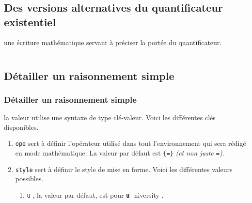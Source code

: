\documentclass[12pt,a4paper]{book}
\theoremstyle{definition}
\newcommand\separation{
	\medskip
	\hfill\rule{0.5\textwidth}{0.75pt}\hfill
	\medskip
}
\newcommand\whyprefix[2]{%
	\textbf{\prefix{#1}}-#2%
}
\newcommand\prefix[1]{%
	\texttt{#1}%
}
\begin{document}
{{%





\subsection{Des versions alternatives du quantificateur existentiel}





 une écriture mathématique servant à préciser la portée du quantificateur.


\separation

















\subsection{Détailler un raisonnement simple}



\subsubsection{Détailler un raisonnement simple} 


\IDoption{} la valeur utilise une syntaxe de type clé-valeur. Voici les différentes clés disponibles.

\begin{enumerate}
	\item \verb+ope+ sert à définir l'opérateur utilisé dans tout l'environnement qui sera rédigé en mode mathématique. 
	      La valeur par défaut est \verb+{=}+ \emph{(et non juste \texttt{=})}.

	\item \verb+style+ sert à définir le style de mise en forme. Voici les différentes valeurs possibles.
	      \begin{enumerate}
	      		\item \prefix{u}, la valeur par défaut, est pour \whyprefix{u}{niversity}.


\end{enumerate}
\end{enumerate}}}
\end{document}
